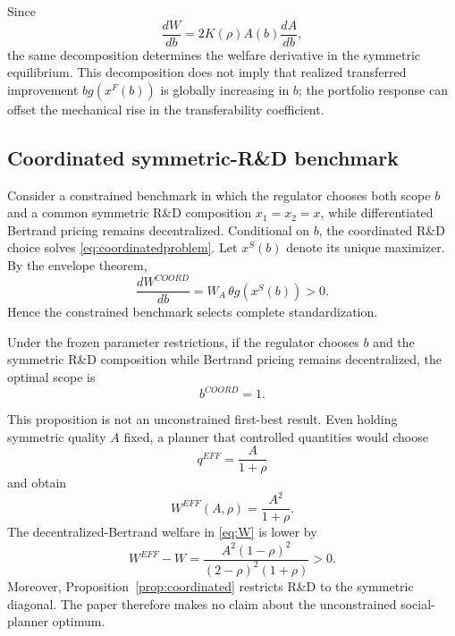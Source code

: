 Since
\begin{equation}
 \frac{dW}{db}=2K(\rho)A(b)\frac{dA}{db},
\end{equation}
the same decomposition determines the welfare derivative in the symmetric equilibrium. This decomposition does not imply that realized transferred improvement $b g(x^F(b))$ is globally increasing in $b$; the portfolio response can offset the mechanical rise in the transferability coefficient.

\subsection{Coordinated symmetric-R\&D benchmark}

Consider a constrained benchmark in which the regulator chooses both scope $b$ and a common symmetric R\&D composition $x_1=x_2=x$, while differentiated Bertrand pricing remains decentralized. Conditional on $b$, the coordinated R\&D choice solves \eqref{eq:coordinatedproblem}. Let $x^S(b)$ denote its unique maximizer. By the envelope theorem,
\begin{equation}
 \frac{dW^{COORD}}{db}
 =W_A\,\theta g(x^S(b))>0.
\end{equation}
Hence the constrained benchmark selects complete standardization.

\begin{proposition}\label{prop:coordinated}
Under the frozen parameter restrictions, if the regulator chooses $b$ and the symmetric R\&D composition while Bertrand pricing remains decentralized, the optimal scope is
\begin{equation}
 b^{COORD}=1.
\end{equation}
\end{proposition}

This proposition is not an unconstrained first-best result. Even holding symmetric quality $A$ fixed, a planner that controlled quantities would choose
\begin{equation}
 q^{EFF}=\frac{A}{1+\rho}
\end{equation}
and obtain
\begin{equation}
 W^{EFF}(A,\rho)=\frac{A^2}{1+\rho}.
\end{equation}
The decentralized-Bertrand welfare in \eqref{eq:W} is lower by
\begin{equation}
 W^{EFF}-W
 =\frac{A^2(1-\rho)^2}{(2-\rho)^2(1+\rho)}>0.
 \label{eq:bertrandgap}
\end{equation}
Moreover, Proposition~\ref{prop:coordinated} restricts R\&D to the symmetric diagonal. The paper therefore makes no claim about the unconstrained social-planner optimum.

